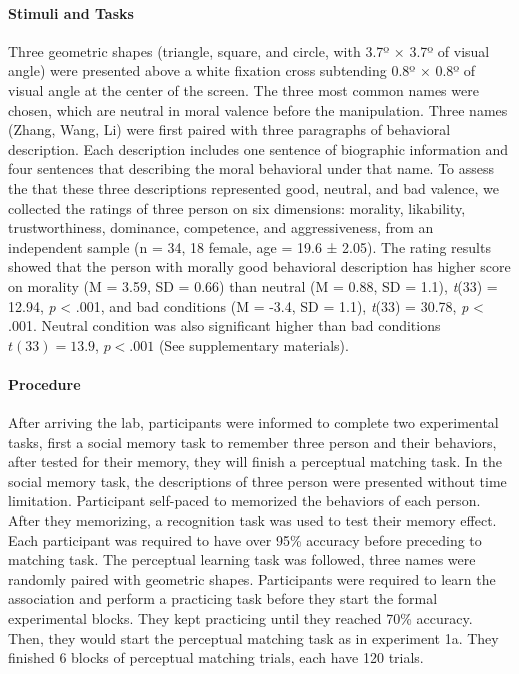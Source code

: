 \documentclass[
  english,
  man]{apa6}
\let\oldparagraph\paragraph
\renewcommand{\paragraph}[1]{\oldparagraph{#1}\mbox{}}
\begin{document}
\hypertarget{stimuli-and-tasks-2}{%
\paragraph{Stimuli and Tasks}\label{stimuli-and-tasks-2}}

Three geometric shapes (triangle, square, and circle, with 3.7º × 3.7º of visual angle) were presented above a white fixation cross subtending 0.8º × 0.8º of visual angle at the center of the screen. The three most common names were chosen, which are neutral in moral valence before the manipulation.
Three names (Zhang, Wang, Li) were first paired with three paragraphs of behavioral description. Each description includes one sentence of biographic information and four sentences that describing the moral behavioral under that name. To assess the that these three descriptions represented good, neutral, and bad valence, we collected the ratings of three person on six dimensions: morality, likability, trustworthiness, dominance, competence, and aggressiveness, from an independent sample (n = 34, 18 female, age = 19.6 ± 2.05). The rating results showed that the person with morally good behavioral description has higher score on morality (M = 3.59, SD = 0.66) than neutral (M = 0.88, SD = 1.1), \emph{t}(33) = 12.94, \emph{p} \textless{} .001, and bad conditions (M = -3.4, SD = 1.1), \emph{t}(33) = 30.78, \emph{p} \textless{} .001. Neutral condition was also significant higher than bad conditions \(t(33) = 13.9\), \(p < .001\) (See supplementary materials).

\hypertarget{procedure-2}{%
\paragraph{Procedure}\label{procedure-2}}

After arriving the lab, participants were informed to complete two experimental tasks, first a social memory task to remember three person and their behaviors, after tested for their memory, they will finish a perceptual matching task.
In the social memory task, the descriptions of three person were presented without time limitation. Participant self-paced to memorized the behaviors of each person. After they memorizing, a recognition task was used to test their memory effect. Each participant was required to have over 95\% accuracy before preceding to matching task.
The perceptual learning task was followed, three names were randomly paired with geometric shapes. Participants were required to learn the association and perform a practicing task before they start the formal experimental blocks. They kept practicing until they reached 70\% accuracy. Then, they would start the perceptual matching task as in experiment 1a. They finished 6 blocks of perceptual matching trials, each have 120 trials.
\end{document}
